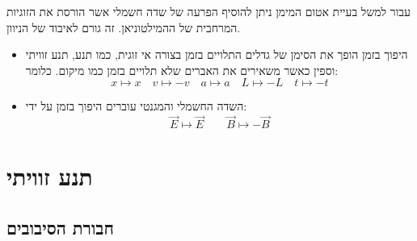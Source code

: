 \documentclass{tstextbook}
\begin{document}
\begin{example}
עבור למשל בעיית אטום המימן ניתן להוסיף הפרעה של שדה חשמלי אשר הורסת את הזוגיות המרחבית של ההמילטוניאן. זה גורם לאיבוד של הניוון.

\end{example}
\begin{summary}
  \begin{itemize}
    \item היפוך בזמן הופך את הסימן של גדלים התלויים בזמן בצורה אי זוגית, כמו תנע, תנע זוויתי וספין כאשר משאירים את האברים שלא תלויים בזמן כמו מיקום. כלומר:
$$x\mapsto x\quad v\mapsto -v\quad a\mapsto a\quad L\mapsto -L\quad t\mapsto-t$$
    \item השדה החשמלי והמגנטי עוברים היפוך בזמן על ידי:
$$\vec{E}\mapsto \vec{E}\qquad \vec{B}\mapsto-\vec{B}$$
  \end{itemize}
\end{summary}
\section{תנע זוויתי}

\subsection{חבורת הסיבובים}
\end{document}
